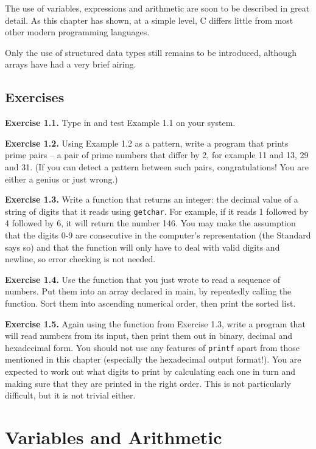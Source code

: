   The use of variables, expressions and arithmetic are soon to be described
   in great detail. As this chapter has shown, at a simple level, C differs
   little from most other modern programming languages.


  Only the use of structured data types still remains to be introduced,
   although arrays have had a very brief airing.


 
        \section{Exercises}
        


  \textbf{Exercise 1.1.} Type in and test Example 1.1 on your
   system.


  \textbf{Exercise 1.2.} Using Example 1.2 as a pattern, write a
   program that prints prime pairs -- a pair of prime numbers that differ
   by 2, for example 11 and 13, 29 and 31. (If you can detect a pattern
   between such pairs, congratulations! You are either a genius or just
   wrong.)


  \textbf{Exercise 1.3.} Write a function that returns an integer: the decimal
   value of a string of digits that it reads using \texttt{getchar}. For
   example, if it reads 1 followed by 4 followed by 6, it will
   return the number 146.  You may make the assumption that the
   digits 0-9 are consecutive in the computer's representation (the
   Standard says so) and that the function will only have to deal with valid
   digits and newline, so error checking is not needed.


  \textbf{Exercise 1.4.} Use the function that you just wrote to read a sequence
   of numbers.  Put them into an array declared in main, by repeatedly calling
   the function. Sort them into ascending numerical order, then print the
   sorted list.


  \textbf{Exercise 1.5.} Again using the function from Exercise 1.3, write a
   program that will read numbers from its input, then print them out in
   binary, decimal and hexadecimal form. You should not use any features of
   \texttt{printf} apart from those mentioned in this chapter (especially
   the hexadecimal output format!). You are expected to work out what digits
   to print by calculating each one in turn and making sure that they are
   printed in the right order. This is not particularly difficult, but it is
   not trivial either.


 \chapter{Variables and Arithmetic}


